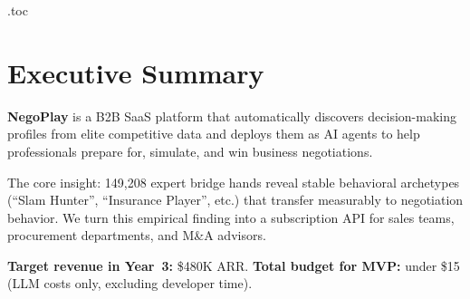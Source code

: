 \documentclass[11pt, a4paper, oneside]{report}
\begin{document}
\setcounter{page}{64}


\makeatletter
{}
\immediate\openout\tf@toc\jobname.toc\relax
\makeatother

\chapter{Executive Summary}
\label{ch:exec}

\begin{keybox}
\textbf{NegoPlay} is a B2B SaaS platform that automatically discovers
decision-making profiles from elite competitive data and deploys them as
AI agents to help professionals prepare for, simulate, and win business
negotiations.

The core insight: 149{,}208 expert bridge hands reveal stable
behavioral archetypes (``Slam Hunter'', ``Insurance Player'', etc.)
that transfer measurably to negotiation behavior. We turn this empirical
finding into a subscription API for sales teams, procurement departments,
and M\&A advisors.

\textbf{Target revenue in Year~3:} \$480K ARR.
\textbf{Total budget for MVP:} under \$15 (LLM costs only, excluding developer time).
\end{keybox}

\vspace{0.6cm}
\end{document}
